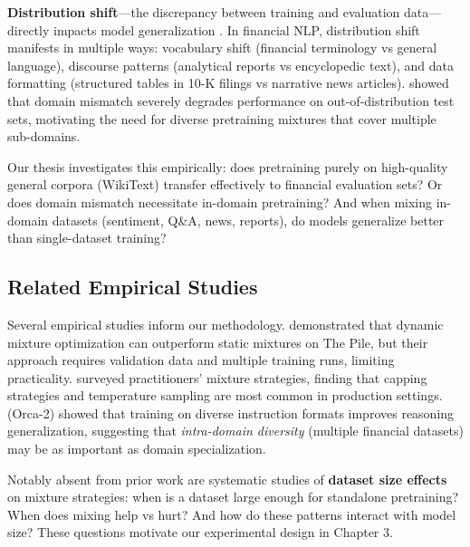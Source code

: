 \textbf{Distribution shift}---the discrepancy between training and evaluation data---directly impacts model generalization \parencite{quinonero2009dataset}. In financial NLP, distribution shift manifests in multiple ways: vocabulary shift (financial terminology vs general language), discourse patterns (analytical reports vs encyclopedic text), and data formatting (structured tables in 10-K filings vs narrative news articles). \textcite{aharoni2020unsupervised} showed that domain mismatch severely degrades performance on out-of-distribution test sets, motivating the need for diverse pretraining mixtures that cover multiple sub-domains.

Our thesis investigates this empirically: does pretraining purely on high-quality general corpora (WikiText) transfer effectively to financial evaluation sets? Or does domain mismatch necessitate in-domain pretraining? And when mixing in-domain datasets (sentiment, Q\&A, news, reports), do models generalize better than single-dataset training?

\subsection{Related Empirical Studies}

Several empirical studies inform our methodology. \textcite{xie2023doremi} demonstrated that dynamic mixture optimization can outperform static mixtures on The Pile, but their approach requires validation data and multiple training runs, limiting practicality. \textcite{longpre2023pretrainer} surveyed practitioners' mixture strategies, finding that capping strategies and temperature sampling are most common in production settings. \textcite{hoffman2024training} (Orca-2) showed that training on diverse instruction formats improves reasoning generalization, suggesting that \textit{intra-domain diversity} (multiple financial datasets) may be as important as domain specialization.

Notably absent from prior work are systematic studies of \textbf{dataset size effects} on mixture strategies: when is a dataset large enough for standalone pretraining? When does mixing help vs hurt? And how do these patterns interact with model size? These questions motivate our experimental design in Chapter 3.
